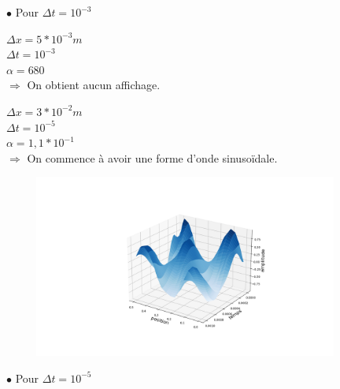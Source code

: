 \begin{enumerate}[label=\alph*)]

\hspace*{1cm}$\bullet$ Pour $\Delta t= {10}^{-3}$ \\
\newline

\begin{minipage}{.6\textwidth}%

\item $\Delta x=5*{10}^{-3}m$ \\
$\Delta t= {10}^{-3}$ \\
$\alpha= 680$\\


$\Longrightarrow$ On obtient aucun affichage.

\end{minipage}%

\begin{minipage}{.45\textwidth}%

\item $\Delta x=3*{10}^{-2}m$ \\
$\Delta t= {10}^{-5}$ \\
$\alpha= 1,1*{10}^{-1} $\\


$\Longrightarrow$ On commence à avoir une forme d'onde sinusoïdale. 

\end{minipage}%
\hfill
\begin{minipage}{.6\textwidth}%
\includegraphics[width=12cm,height=6cm]{dt=0.00001 avec dx=0.03.png}
\end{minipage}%


\hspace*{1cm}$\bullet$ Pour $\Delta t= {10}^{-5}$ \\


\end{enumerate}
